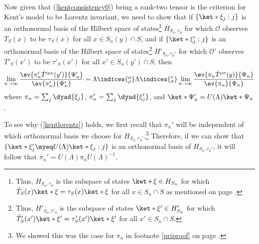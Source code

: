 \documentclass[12pt]{report}
\begin{document}
Now given that (\ref{kentconsistency0}) being a rank-two tensor is the criterion for Kent's model to be Lorentz invariant, we need to show that if $\{\ket*{\xi_j}:j\}$ is an %
%
orthonormal basis of the Hilbert space of states\footnote{Thus, $H_{S_n,\tau_S}$ is the subspace of states $\ket*{\xi}\in H_{S_n}$ for which  $\hat{T}_S(x)\ket*{\xi}=\tau_S(x)\ket*{\xi}$  for all $x\in S_n\cap S$ as mentioned on page \pageref{HStau}.} $H_{S_n,\tau_S}$ for which $\mathcal{O}$ observes $T_S(x)$ to be $\tau_S(x)$ for all $x\in S_n(y)\cap S$, and if $\{\ket*{\xi_j'}:j\}$ is %
%
 an orthonormal basis of the Hilbert space %
  of states\footnote{Thus,  $H'_{S_n,\tau'_S}$ is the subspace of states $\ket*{\xi'}\in H'_{S_n}$ for which  $\hat{T}'_S(x')\ket*{\xi'}=\tau'_S(x')\ket*{\xi'}$  for all $x'\in S_n\cap S$. } $H'_{S_n,\tau_S'}$ for which $\mathcal{O}'$ observes $T'_S(x')$ to be $\tau'_S(x')$ for all $x'\in S_n(y')\cap S$, then
\begin{equation}\label{kentlorentz}
\lim_{n\rightarrow\infty}\frac{\ev{\pi_n'\hat{T}^{\prime\mu\nu}(y')}{\Psi_n'}}{\ev{\pi_n'}{\Psi_n'}}=\Lambda\indices{^\mu_\rho}\Lambda\indices{^\nu_\sigma} \lim_{n\rightarrow\infty}\frac{\ev{\pi_n\hat{T}^{\rho\sigma}(y)}{\Psi_n}}{\ev{\pi_n}{\Psi_n}}
\end{equation}
where $\pi_n=\sum_j\dyad{\xi_j}$, $\pi_n'=\sum_j\dyad{\xi_j'}$, and $\ket*{\Psi_n'}=U(\Lambda)\ket*{\Psi_n}$.  %
%

To see why (\ref{kentlorentz}) holds, we first recall that $\pi_n'$ will be independent of which orthonormal basis we choose for $H_{S_n,\tau_S'}$.\footnote{We showed this was the case for $\pi_n$ in footnote \ref{priproof} on page \pageref{priproof}.} Therefore, if we can show that $\{\ket*{\xi_j'}\myeq U(\Lambda)\ket*{\xi_j}:j\}$ is an orthonormal basis of $H_{S_n,\tau_S'}$, it will follow that $\pi_n'=U(\Lambda)\pi_nU(\Lambda)^{-1}$. 
\end{document}

